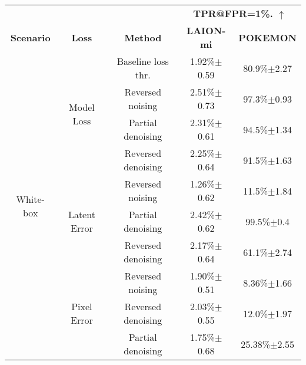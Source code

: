 \begin{tabular}{c c c c c}
    \toprule
                                &                               &                        & \multicolumn{2}{c}{\textbf{TPR@FPR=1\%. $\uparrow$}}                      \\
    \textbf{Scenario}           & \textbf{Loss}                 & \textbf{Method}        & \textbf{ LAION-mi}                                   & \textbf{POKEMON}   \\

    \midrule
    \multirow{10}{*}{White-box} & \multirow{4}{*}{Model Loss}   & Baseline loss thr.     & 1.92\%$\pm$0.59                                      & 80.9\%$\pm$2.27    \\
    \cmidrule{3-5}

                                &                               & Reversed noising       & 2.51\%$\pm$0.73                                      & 97.3\%$\pm$0.93    \\
                                &                               & Partial denoising      & 2.31\%$\pm$0.61                                      & 94.5\%$\pm$1.34    \\
                                &                               & Reversed denoising     & 2.25\%$\pm$0.64                                      & 91.5\%$\pm$1.63    \\


    \cmidrule{2-5}

                                & \multirow{3}{*}{Latent Error} & Reversed noising       & 1.26\%$\pm$0.62                                      & 11.5\%$\pm$1.84    \\
                                &                               & Partial denoising      & 2.42\%$\pm$0.62                                      & 99.5\%$\pm$0.4   \\
                                &                               & Reversed denoising     & 2.17\%$\pm$0.64                                      & 61.1\%$\pm$2.74    \\

    \cmidrule{2-5}


                                & \multirow{3}{*}{Pixel Error}  & Reversed noising       & 1.90\%$\pm$0.51                                      & 8.36\%$\pm$1.66    \\
                                &                               & Reversed denoising     & 2.03\%$\pm$0.55                                    & 12.0\%$\pm$1.97    \\
                                &                               & Partial denoising      & 1.75\%$\pm$0.68                                      & 25.38\%$\pm$2.55 \\
    \midrule


\end{tabular}
